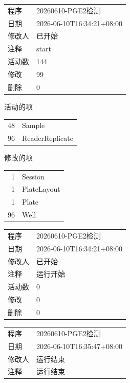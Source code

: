\documentclass[UTF8,10pt,a4paper,fontset=fandol]{ctexart}
\begin{document}
\vspace{1em}

\noindent
\begin{tabular}{@{}p{3.2cm}p{11.5cm}@{}}
程序 & 20260610-PGE2检测\\
日期 & 2026-06-10T16:34:21+08:00\\
修改人 & 已开始\\
注释 & start\\
活动数 & 144\\
修改 & 99\\
删除 & 0\\
\end{tabular}

\noindent
活动的项

\begin{tabular}{@{}r@{\quad}l@{}}
48 & Sample\\
96 & ReaderReplicate\\
\end{tabular}

\noindent
修改的项

\begin{tabular}{@{}r@{\quad}l@{}}
1 & Session\\
1 & PlateLayout\\
1 & Plate\\
96 & Well\\
\end{tabular}

\vspace{1em}

\noindent
\begin{tabular}{@{}p{3.2cm}p{11.5cm}@{}}
程序 & 20260610-PGE2检测\\
日期 & 2026-06-10T16:34:21+08:00\\
修改人 & 已开始\\
注释 & 运行开始\\
活动数 & 0\\
修改 & 0\\
删除 & 0\\
\end{tabular}

\vspace{1em}

\noindent
\begin{tabular}{@{}p{3.2cm}p{11.5cm}@{}}
程序 & 20260610-PGE2检测\\
日期 & 2026-06-10T16:35:47+08:00\\
修改人 & 运行结束\\
注释 & 运行结束\\
\end{tabular}
\end{document}
